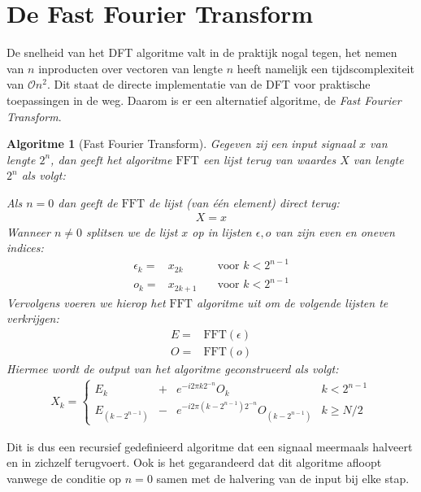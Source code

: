 \documentclass[11pt]{amsart}
\newcommand{\e}{\epsilon}
\renewcommand{\O}{\mathcal{O}}
\newcommand{\FFT}{\text{FFT}}
\newtheorem*{algo}{Algoritme}
\newcommand{\eq}[1]{\begin{eqnarray*} #1 \end{eqnarray*}}
\begin{document}
\section{De Fast Fourier Transform}
De snelheid van het DFT algoritme valt in de praktijk nogal tegen, het nemen van $n$ inproducten over vectoren 
van lengte $n$ heeft namelijk een tijdscomplexiteit van $\O{n^2}$. Dit staat de directe implementatie van de DFT 
voor praktische toepassingen in de weg. Daarom is er een alternatief algoritme, de \emph{Fast Fourier Transform}.  \bigskip

\begin{algo}[Fast Fourier Transform]
Gegeven zij een input signaal $x$ van lengte $2^n$, dan geeft het algoritme $\FFT$ 
een lijst terug van waardes $X$ van lengte $2^n$ als volgt:

Als $n=0$ dan geeft de $\FFT$ de lijst (van \'e\'en element) direct terug:
\eq{
X = x
}
Wanneer $n\neq0$ splitsen we de lijst $x$ op in lijsten $\e,o$ van zijn even en oneven indices:
\eq{
  \e_k   =& x_{2k}   &\quad \text{voor } k < 2^{n-1}\\
   o_k   =& x_{2k+1} &\quad \text{voor } k < 2^{n-1}
}
Vervolgens voeren we hierop het $\FFT$ algoritme uit om de volgende lijsten te verkrijgen:
\eq{
  E =& \FFT(\e) \\
  O =& \FFT(o)
}
Hiermee wordt de output van het algoritme geconstrueerd als volgt:
\eq{
  X_k = \left\{\begin{array}{llll}
    E_k         &+& e^{-i2\pi k2^{-n}} O_k &  k< 2^{n-1} \\
    E_{(k-2^{n-1})} &-& e^{-i2\pi (k-2^{n-1})2^{-n}} O_{(k-2^{n-1})} &  k\geq N/2 
  \end{array}\right.
}
\end{algo}

Dit is dus een recursief gedefinieerd algoritme dat een signaal meermaals halveert en in zichzelf terugvoert.
Ook is het gegarandeerd dat dit algoritme afloopt vanwege de conditie op $n=0$ samen met de halvering van de input bij elke stap.\bigskip
\end{document}
